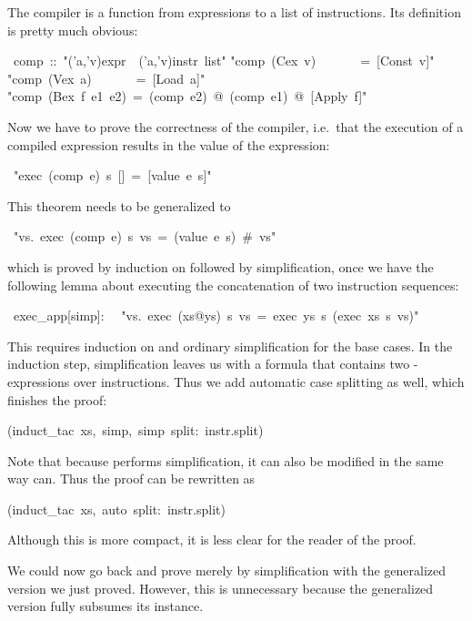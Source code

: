 \begin{isabelle}
\begin{isamarkuptext}
The compiler is a function from expressions to a list of instructions. Its
definition is pretty much obvious:%
\end{isamarkuptext}%
~comp~::~{"}('a,'v)expr~{\isasymRightarrow}~('a,'v)instr~list{"}\isanewline
{}\isanewline
{"}comp~(Cex~v)~~~~~~~=~[Const~v]{"}\isanewline
{"}comp~(Vex~a)~~~~~~~=~[Load~a]{"}\isanewline
{"}comp~(Bex~f~e1~e2)~=~(comp~e2)~@~(comp~e1)~@~[Apply~f]{"}%
\begin{isamarkuptext}%
Now we have to prove the correctness of the compiler, i.e.\ that the
execution of a compiled expression results in the value of the expression:%
\end{isamarkuptext}%
~{"}exec~(comp~e)~s~[]~=~[value~e~s]{"}%
\begin{isamarkuptext}%
\noindent
This theorem needs to be generalized to%
\end{isamarkuptext}%
~{"}{\isasymforall}vs.~exec~(comp~e)~s~vs~=~(value~e~s)~\#~vs{"}%
\begin{isamarkuptxt}%
\noindent
which is proved by induction on  followed by simplification, once
we have the following lemma about executing the concatenation of two
instruction sequences:%
\end{isamarkuptxt}%
~exec\_app[simp]:\isanewline
~~{"}{\isasymforall}vs.~exec~(xs@ys)~s~vs~=~exec~ys~s~(exec~xs~s~vs){"}%
\begin{isamarkuptxt}%
\noindent
This requires induction on  and ordinary simplification for the
base cases. In the induction step, simplification leaves us with a formula
that contains two -expressions over instructions. Thus we add
automatic case splitting as well, which finishes the proof:%
\end{isamarkuptxt}%
(induct\_tac~xs,~simp,~simp~split:~instr.split)%
\begin{isamarkuptext}%
\noindent
Note that because  performs simplification, it can
also be modified in the same way  can. Thus the proof can be
rewritten as%
\end{isamarkuptext}%
(induct\_tac~xs,~auto~split:~instr.split)%
\begin{isamarkuptext}%
\noindent
Although this is more compact, it is less clear for the reader of the proof.

We could now go back and prove 
merely by simplification with the generalized version we just proved.
However, this is unnecessary because the generalized version fully subsumes
its instance.%
\end{isamarkuptext}%
\end{isabelle}%
